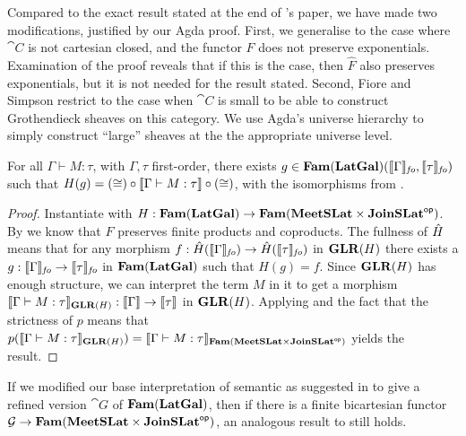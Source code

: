 \begin{remark}
  Compared to the exact result stated at the end of
  \citet{fiore-simpson99}'s paper, we have made two modifications,
  justified by our Agda proof. First, we generalise to the case where
  $\cat{C}$ is not cartesian closed, and the functor $F$ does not
  preserve exponentials. Examination of the proof reveals that if this
  is the case, then $\hat{F}$ also preserves exponentials, but it is
  not needed for the result stated. Second, Fiore and Simpson restrict
  to the case when $\cat{C}$ is small to be able to construct
  Grothendieck sheaves on this category. We use Agda's universe
  hierarchy to simply construct ``large'' sheaves at the the
  appropriate universe level.
\end{remark}

\begin{theorem}
  \label{thm:language-definability}
  For all $\Gamma \vdash M : \tau$, with $\Gamma, \tau$ first-order,
  there exists
  $g \in \mathbf{Fam}(\mathbf{LatGal})(\llbracket \Gamma \rrbracket_{\mathit{fo}},
  \llbracket \tau \rrbracket_{\mathit{fo}})$ such that
  $H(g) = (\cong) \circ \llbracket \Gamma \vdash M : \tau \rrbracket \circ (\cong)$,
  with the isomorphisms from .
\end{theorem}

\begin{proof}
  Instantiate  with
  $H : \mathbf{Fam}(\mathbf{LatGal}) \to \mathbf{Fam}(\mathbf{MeetSLat} \times
  \mathbf{JoinSLat}^{\mathsf{op}})$. By  we know that $F$
  preserves finite products and coproducts. The fullness of
  $\hat{H}$ means that for any morphism
  $f : \hat{H}(\llbracket \Gamma \rrbracket_{\mathit{fo}}) \to
  \hat{H}(\llbracket \tau \rrbracket_{\mathit{fo}})$ in $\mathbf{GLR}(H)$ there exists
  a $g : \llbracket \Gamma \rrbracket_{\mathit{fo}} \to \llbracket \tau \rrbracket_{\mathit{fo}}$ in
  $\mathbf{Fam}(\mathbf{LatGal})$ such that $H(g) = f$. Since $\mathbf{GLR}(H)$ has
  enough structure, we can interpret the term $M$ in it to get a
  morphism
  $\llbracket \Gamma \vdash M : \tau \rrbracket_{\mathbf{GLR}(H)} : \llbracket \Gamma \rrbracket \to
  \llbracket \tau \rrbracket$ in $\mathbf{GLR}(H)$. Applying
   and the fact that the
  strictness of $p$ means that
  $p(\llbracket \Gamma \vdash M : \tau \rrbracket_{\mathbf{GLR}(H)}) = \llbracket \Gamma
    \vdash M : \tau \rrbracket_{\mathbf{Fam}(\mathbf{MeetSLat} \times \mathbf{JoinSLat}^{\mathsf{op}})}$ yields
  the result.
\end{proof}

\begin{remark}
  If we modified our base interpretation of semantic \GPS as suggested
  in  to give a refined version $\cat{G}$ of
  $\mathbf{Fam}(\mathbf{LatGal})$, then if there is a finite bicartesian functor
  $\mathcal{G} \to \mathbf{Fam}(\mathbf{MeetSLat} \times \mathbf{JoinSLat}^{\mathsf{op}})$, an analogous
  result to  still holds.
\end{remark}

